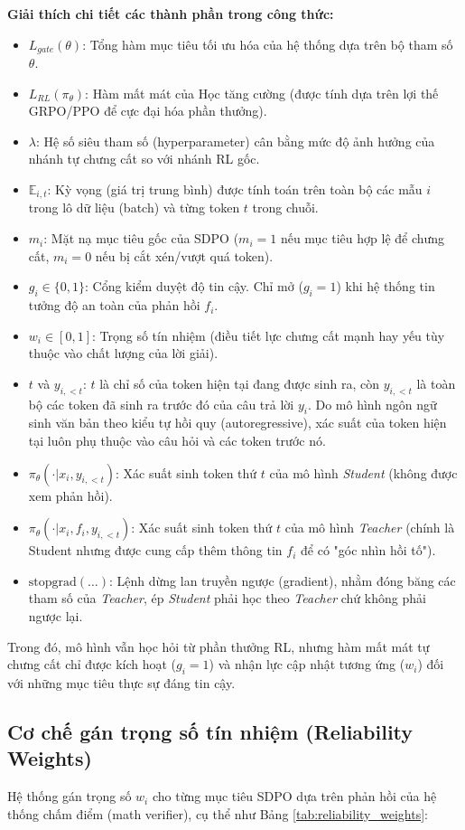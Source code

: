 \documentclass[12pt,a4paper]{report}
\begin{document}
\textbf{Giải thích chi tiết các thành phần trong công thức:}
\begin{itemize}
    \item $L_{gate}(\theta)$: Tổng hàm mục tiêu tối ưu hóa của hệ thống dựa trên bộ tham số $\theta$.
    \item $L_{RL}(\pi_\theta)$: Hàm mất mát của Học tăng cường (được tính dựa trên lợi thế GRPO/PPO để cực đại hóa phần thưởng).
    \item $\lambda$: Hệ số siêu tham số (hyperparameter) cân bằng mức độ ảnh hưởng của nhánh tự chưng cất so với nhánh RL gốc.
    \item $\mathbb{E}_{i,t}$: Kỳ vọng (giá trị trung bình) được tính toán trên toàn bộ các mẫu $i$ trong lô dữ liệu (batch) và từng token $t$ trong chuỗi.
    \item $m_i$: Mặt nạ mục tiêu gốc của SDPO ($m_i = 1$ nếu mục tiêu hợp lệ để chưng cất, $m_i = 0$ nếu bị cắt xén/vượt quá token).
    \item $g_i \in \{0, 1\}$: Cổng kiểm duyệt độ tin cậy. Chỉ mở ($g_i=1$) khi hệ thống tin tưởng độ an toàn của phản hồi $f_i$.
    \item $w_i \in [0, 1]$: Trọng số tín nhiệm (điều tiết lực chưng cất mạnh hay yếu tùy thuộc vào chất lượng của lời giải).
    \item $t$ và $y_{i,<t}$: $t$ là chỉ số của token hiện tại đang được sinh ra, còn $y_{i,<t}$ là toàn bộ các token đã sinh ra trước đó của câu trả lời $y_i$. Do mô hình ngôn ngữ sinh văn bản theo kiểu tự hồi quy (autoregressive), xác suất của token hiện tại luôn phụ thuộc vào câu hỏi và các token trước nó.
    \item $\pi_\theta(\cdot | x_i, y_{i,<t})$: Xác suất sinh token thứ $t$ của mô hình \textit{Student} (không được xem phản hồi).
    \item $\pi_\theta(\cdot | x_i, f_i, y_{i,<t})$: Xác suất sinh token thứ $t$ của mô hình \textit{Teacher} (chính là Student nhưng được cung cấp thêm thông tin $f_i$ để có "góc nhìn hồi tố").
    \item $\text{stopgrad}(\dots)$: Lệnh dừng lan truyền ngược (gradient), nhằm đóng băng các tham số của \textit{Teacher}, ép \textit{Student} phải học theo \textit{Teacher} chứ không phải ngược lại.
\end{itemize}
Trong đó, mô hình vẫn học hỏi từ phần thưởng RL, nhưng hàm mất mát tự chưng cất chỉ được kích hoạt ($g_i=1$) và nhận lực cập nhật tương ứng ($w_i$) đối với những mục tiêu thực sự đáng tin cậy.

\subsection{Cơ chế gán trọng số tín nhiệm (Reliability Weights)}
Hệ thống gán trọng số $w_i$ cho từng mục tiêu SDPO dựa trên phản hồi của hệ thống chấm điểm (math verifier), cụ thể như Bảng \ref{tab:reliability_weights}:
\end{document}

